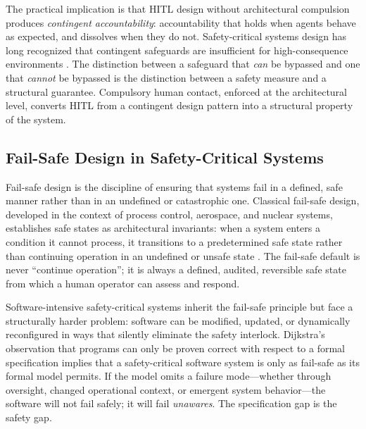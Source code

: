 The practical implication is that HITL design without architectural compulsion produces \emph{contingent accountability}: accountability that holds when agents behave as expected, and dissolves when they do not. Safety-critical systems design has long recognized that contingent safeguards are insufficient for high-consequence environments \cite{tristr81}. The distinction between a safeguard that \emph{can} be bypassed and one that \emph{cannot} be bypassed is the distinction between a safety measure and a structural guarantee. Compulsory human contact, enforced at the architectural level, converts HITL from a contingent design pattern into a structural property of the system.

\subsection{Fail-Safe Design in Safety-Critical Systems}

Fail-safe design is the discipline of ensuring that systems fail in a defined, safe manner rather than in an undefined or catastrophic one. Classical fail-safe design, developed in the context of process control, aerospace, and nuclear systems, establishes safe states as architectural invariants: when a system enters a condition it cannot process, it transitions to a predetermined safe state rather than continuing operation in an undefined or unsafe state \cite{tristr81}. The fail-safe default is never ``continue operation''; it is always a defined, audited, reversible safe state from which a human operator can assess and respond.

Software-intensive safety-critical systems inherit the fail-safe principle but face a structurally harder problem: software can be modified, updated, or dynamically reconfigured in ways that silently eliminate the safety interlock. Dijkstra's observation that programs can only be proven correct with respect to a formal specification \cite{dijkstra1982} implies that a safety-critical software system is only as fail-safe as its formal model permits. If the model omits a failure mode—whether through oversight, changed operational context, or emergent system behavior—the software will not fail safely; it will fail \emph{unawares}. The specification gap is the safety gap.

